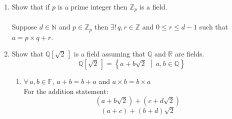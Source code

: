 \documentclass[letterpaper,12pt]{article}
\newcommand{\gap}{\vspace*{0.25cm}}
\begin{document}
\gap
\begin{spacing}{1.5}
  \begin{enumerate}
\item
  Show that if $p$ is a prime integer then $\mathbb{Z}_p$ is a field.
\paragraph{}
Suppose $d \in \mathbb{N}$ and $p \in \mathbb{Z}_p$ then $\exists{}! \, q,
r \in \mathbb{Z}$ and $0 \leq r \leq d -1$ such that $a = p \times q +
r$.  

\newpage{}
\item
  Show that $\mathbb{Q}\left[\sqrt{2}\,\right]$ is a field assuming that
  $\mathbb{Q}$ and $\mathbb{R}$ are fields. 
\begin{equation}
\mathbb{Q}\left[\sqrt{2}\,\right]=\left\{a +b\sqrt{2} \;\middle|\; a, b \in
\mathbb{Q}\right\}
\end{equation}
\begin{enumerate}[(F 1)]
\item $ \forall \, a, b \in \mathbb{F},\, a+b = b+a$ and $a\times b = b
  \times a$\\
For the addition statement:
\begin{equation}
\left(a + b\sqrt{2}\right) + \left(c+d\sqrt{2}\right)
\end{equation}
\begin{equation}\label{uncommute}
\left(a + c\right) + \left(b + d\right)\sqrt{2}
\end{equation}


\end{enumerate}
\end{enumerate}
\end{spacing}
\end{document}
